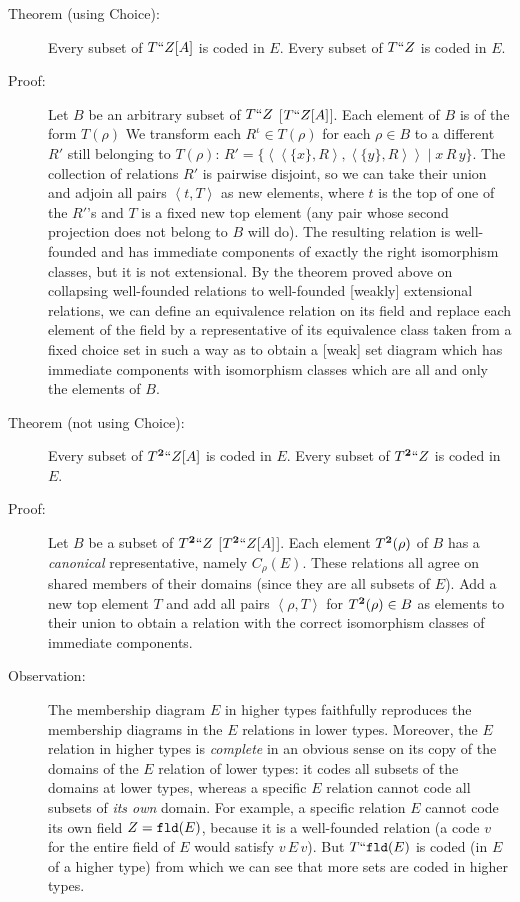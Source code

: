 \documentclass[12pt]{book}
\begin{document}
\begin{description}
\item[Theorem (using Choice):] Every subset of $T``Z[A]$ is coded in
$E$.  Every subset of $T``Z$ is coded in $E$.

\item[Proof:] Let $B$ be an arbitrary subset of $T``Z$ [$T``Z[A]$].
Each element of $B$ is of the form $T(\rho)$ We transform each
$R^{\iota}\in T(\rho)$ for each $\rho\in B$ to a different $R'$ still
belonging to $T(\rho)$: $R' =
\{\left<\left<\{x\},R\right>,\left<\{y\},R\right>\right>\mid
x\,R\,y\}$.  The collection of relations $R'$ is pairwise disjoint, so
we can take their union and adjoin all pairs $\left< t,T\right>$ as
new elements, where $t$ is the top of one of the $R'$'s and $T$ is a
fixed new top element (any pair whose second projection does not
belong to $B$ will do).  The resulting relation is well-founded and
has immediate components of exactly the right isomorphism classes, but
it is not extensional.  By the theorem proved above on collapsing
well-founded relations to well-founded [weakly] extensional relations,
we can define an equivalence relation on its field and replace each
element of the field by a representative of its equivalence class
taken from a fixed choice set in such a way as to obtain a [weak] set
diagram which has immediate components with isomorphism classes which
are all and only the elements of $B$.

\item[Theorem (not using Choice):] Every subset of $T^{\bf 2}``Z[A]$ is
coded in $E$.  Every subset of $T^{\bf 2}``Z$ is coded in $E$.

\item[Proof:] Let $B$ be a subset of $T^{\bf 2}``Z$ [$T^{\bf
2}``Z[A]$].  Each element $T^{\bf 2}(\rho)$ of $B$ has a {\em
canonical\/} representative, namely $C_{\rho}(E)$.  These relations
all agree on shared members of their domains (since they are all
subsets of $E$).  Add a new top element $T$ and add all pairs
$\left<\rho,T\right>$ for $T^{\bf 2}(\rho) \in B$ as elements to their
union to obtain a relation with the correct isomorphism classes of
immediate components.

\item[Observation:] The membership diagram $E$ in higher types
faithfully reproduces the membership diagrams in the $E$ relations in
lower types.  Moreover, the $E$ relation in higher types is {\em
complete\/} in an obvious sense on its copy of the domains of the $E$
relation of lower types: it codes all subsets of the domains at lower
types, whereas a specific $E$ relation cannot code all subsets of {\em
its own\/} domain.  For example, a specific relation $E$ cannot code
its own field $Z={\tt fld}(E)$, because it is a well-founded relation
(a code $v$ for the entire field of $E$ would satisfy $v \,E\, v$).
But $T``{\tt fld}(E)$ is coded (in $E$ of a higher type) from which
we can see that more sets are coded in higher types.

\end{description}
\end{document}

